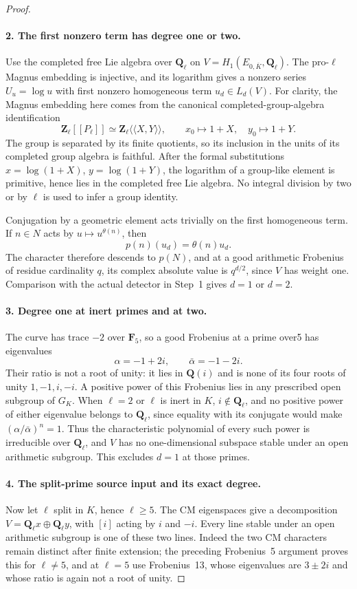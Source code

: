 \begin{proof}
\paragraph{2. The first nonzero term has degree one or two.}
Use the completed free Lie algebra over $\mathbf Q_\ell$ on $V=H_1(E_{0,\overline K},\mathbf Q_\ell)$. The pro-$\ell$ Magnus embedding is injective, and its logarithm gives a nonzero series $U_u=\log u$ with first nonzero homogeneous term $u_d\in L_d(V)$. For clarity, the Magnus embedding here comes from the canonical completed-group-algebra identification
\[
 \mathbf Z_\ell[[P_\ell]]\simeq\mathbf Z_\ell\langle\!\langle X,Y\rangle\!\rangle,
 \qquad x_0\mapsto1+X,\quad y_0\mapsto1+Y.
\]
The group is separated by its finite quotients, so its inclusion in the units of its completed group algebra is faithful. After the formal substitutions $x=\log(1+X)$, $y=\log(1+Y)$, the logarithm of a group-like element is primitive, hence lies in the completed free Lie algebra. No integral division by two or by $\ell$ is used to infer a group identity.

Conjugation by a geometric element acts trivially on the first homogeneous term. If $n\in N$ acts by $u\mapsto u^{\theta(n)}$, then
\[
 p(n)(u_d)=\theta(n)u_d.
\]
The character therefore descends to $p(N)$, and at a good arithmetic Frobenius of residue cardinality $q$, its complex absolute value is $q^{d/2}$, since $V$ has weight one. Comparison with the actual detector in Step~1 gives $d=1$ or $d=2$.

\paragraph{3. Degree one at inert primes and at two.}
The curve has trace $-2$ over $\mathbf F_5$, so a good Frobenius at a prime over5 has eigenvalues
\[
 \alpha=-1+2i,\qquad\bar\alpha=-1-2i.
\]
Their ratio is not a root of unity: it lies in $\mathbf Q(i)$ and is none of its four roots of unity $1,-1,i,-i$. A positive power of this Frobenius lies in any prescribed open subgroup of $G_K$. When $\ell=2$ or $\ell$ is inert in $K$, $i\notin\mathbf Q_\ell$, and no positive power of either eigenvalue belongs to $\mathbf Q_\ell$, since equality with its conjugate would make $(\alpha/\bar\alpha)^n=1$. Thus the characteristic polynomial of every such power is irreducible over $\mathbf Q_\ell$, and $V$ has no one-dimensional subspace stable under an open arithmetic subgroup. This excludes $d=1$ at those primes.

\paragraph{4. The split-prime source input and its exact degree.}
Now let $\ell$ split in $K$, hence $\ell\ge5$. The CM eigenspaces give a decomposition $V=\mathbf Q_\ell x\oplus\mathbf Q_\ell y$, with $[i]$ acting by $i$ and $-i$. Every line stable under an open arithmetic subgroup is one of these two lines. Indeed the two CM characters remain distinct after finite extension; the preceding Frobenius~5 argument proves this for $\ell\ne5$, and at $\ell=5$ use Frobenius~13, whose eigenvalues are $3\pm2i$ and whose ratio is again not a root of unity.


\end{proof}
